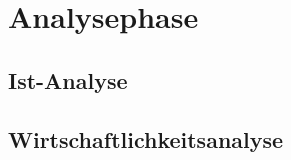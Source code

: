 \newpage
\section{Analysephase}
\label{analysephase}

\subsection{Ist-Analyse}
\label{ist}
\begin{comment}
Wie eingangs in Kapitel \ref{projektumfeld} kurz erwähnt, verwendet \ac{SAZ} ein \ac{ERP}-System, welches regelmäßige Updates erhält und individuell angepasst werden kann. Durch die individuellen Anpassungen muss nach jedem Update, vor Produktivsetzung, ein Test durch die Anwender erfolgen. Die Resonanz dieser Testläufe, sowie die nachgelagerte Kommunikation aus Emails und ggf. Telefonaten, werden zurzeit über ein Exchange-Postfach verwaltet. Die eingehenden Rückmeldungen werden von den Entwicklern zu Aufgaben formuliert, anschließend kategorisiert, kommentiert und in einer Excel-Datei gelistet, welche als Grundlage zur weiteren Bearbeitung und Lösung der Problemstellungen dient.  Die Kategorisierung erfolgt auf Basis der Dringlichkeit. Tasks, die in der Produktivsetzung die Arbeit einschränken würden, werden vorrangig bearbeitet. Die Excel-Datei erhält zusätzlich eine farbliche Kategorisierung, sodass die Entwickler in kurzer Zeit einen Überblick erhalten, welche Tasks abgeschlossen, behoben, in Bearbeitung sind oder mit dem \ac{ERP}-Hersteller besprochen werden müssen. Die Liste beinhaltet noch weitere Informationen. Entwickler können für die einzelnen Tasks Kommentare, Workarounds und Testbeschreibungen verfassen und zusätzlich Dateipfade für weitere Materialien, wie z.B. Screenshots von Fehlermeldungen, hinterlegen. Einen hohen Stellenwert nimmt dabei die Spalte der Kommentare ein, denn häufig erfolgen Rückfragen durch die Entwickler, da die Rückmeldungen der Anwender keiner einheitlichen Form folgen und teilweise notwendige Informationen zur Problemlösung fehlen. Zu beachten ist, dass auch zur aktuellen produktiv laufenden Version, Anfragen von Anwendern eintreffen, die nach dem identischen Schema verarbeitet werden. Diese Vorgehensweise, der Protokollierung in einer Excel-Datei, Kommunikation über ein Exchange-Postfach und die nicht einheitliche Form der Meldung bindet unnötig Ressourcen und verlängert die Projektzeit teilweise erheblich.	
\end{comment}


\subsection{Wirtschaftlichkeitsanalyse}
\label{wirtschaftlichkeitsanalyse}

